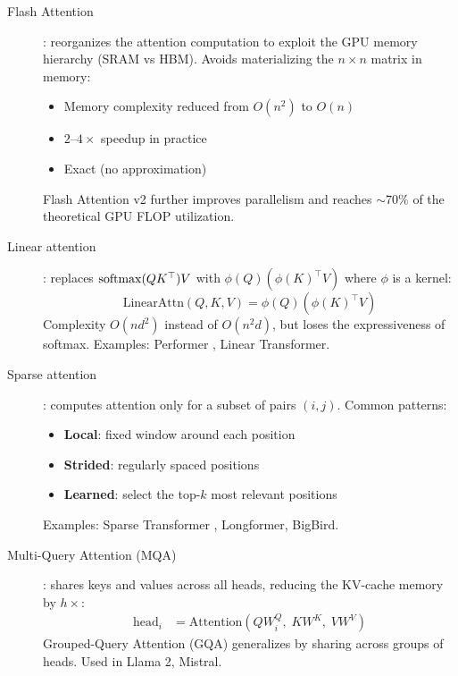 \begin{sota}[title=\textbf{Modern attention variants}]
\begin{description}
  \item[Flash Attention] \cite{dao2022flashattention}: reorganizes the
    attention computation to exploit the GPU memory hierarchy (SRAM vs HBM).
    Avoids materializing the $n \times n$ matrix in memory:
    \begin{itemize}
      \item Memory complexity reduced from $O(n^2)$ to $O(n)$
      \item $2\text{--}4\times$ speedup in practice
      \item Exact (no approximation)
    \end{itemize}
    Flash Attention v2 further improves parallelism and reaches $\sim 70\%$
    of the theoretical GPU FLOP utilization.

  \item[Linear attention]: replaces $\mathrm{softmax}(QK^\top)V$ with
    $\phi(Q)(\phi(K)^\top V)$ where $\phi$ is a kernel:
    \begin{equation}
      \text{LinearAttn}(Q, K, V) = \phi(Q) \left(\phi(K)^\top V\right)
    \end{equation}
    Complexity $O(n d^2)$ instead of $O(n^2 d)$, but loses the expressiveness
    of softmax. Examples: Performer \cite{choromanski2021rethinking},
    Linear Transformer.

  \item[Sparse attention]: computes attention only for a subset of pairs
    $(i, j)$. Common patterns:
    \begin{itemize}
      \item \textbf{Local}: fixed window around each position
      \item \textbf{Strided}: regularly spaced positions
      \item \textbf{Learned}: select the top-$k$ most relevant positions
    \end{itemize}
    Examples: Sparse Transformer \cite{child2019generating}, Longformer,
    BigBird.

  \item[Multi-Query Attention (MQA)] \cite{shazeer2019fast}: shares keys
    and values across all heads, reducing the KV-cache memory by $h \times$:
    \begin{align}
      \text{head}_i &= \text{Attention}(Q W_i^Q,\; K W^K,\; V W^V)
    \end{align}
    Grouped-Query Attention (GQA) generalizes by sharing across groups of
    heads. Used in Llama 2, Mistral.


\end{description}
\end{sota}
